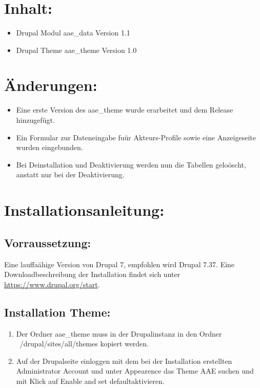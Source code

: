 \documentclass{swp}
\begin{document}
\\\\\\\\\\

\section{Inhalt:}
\begin{itemize} 
\item Drupal Modul \glqq aae\_{}data\grqq{} Version 1.1
\item Drupal Theme \glqq aae\_{}theme\grqq{} Version 1.0
\end{itemize}
\section{\"Anderungen:}
\begin{itemize} 
\item Eine erste Version des \glqq aae\_{}theme\grqq{} wurde erarbeitet und dem Release hinzugef\"ugt.
\item Ein Formular zur Dateneingabe fu\"ur Akteurs-Profile sowie eine Anzeigeseite wurden
eingebunden.
\item Bei Deinstallation und Deaktivierung werden nun die Tabellen gelo\"oscht, anstatt nur bei
der Deaktivierung.
\end{itemize}
\section{Installationsanleitung:}
\subsection{Vorraussetzung:}
Eine lauffa\"ahige Version von Drupal 7, empfohlen wird Drupal 7.37. Eine Downloadbeschreibung der Installation findet sich unter \url{https://www.drupal.org/start}.
\subsection{Installation Theme:}
\begin{enumerate}
\item Der Ordner \glqq aae\_{}theme\grqq{} muss in der Drupalinstanz in den Ordner \glqq ~/drupal/sites/all/themes\grqq{} kopiert werden.
\item  Auf der Drupalseite einloggen mit dem bei der Installation erstellten Administrator Account und unter \glqq Appearence\grqq{} das Theme \glqq AAE\grqq{} suchen und mit Klick auf \glqq Enable and set default\grqq aktivieren.
\end{enumerate}
\end{document}
